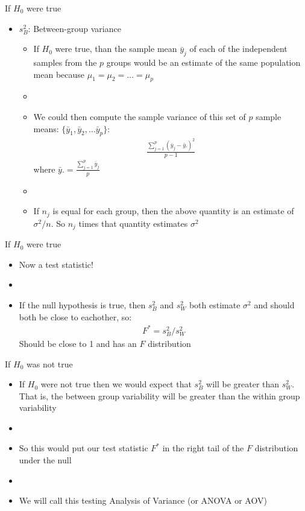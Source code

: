 \documentclass[xcolor=dvipsnames]{beamer}
\begin{document}
\begin{frame}{If $H_0$ were true}
	\begin{itemize}
		\item $s_B^2$: Between-group variance 
		\begin{itemize}
			\item If $H_0$ were true, than the sample mean  $\bar{y}_j$ of each of the independent samples from the $p$ groups would be an estimate of the same population mean because $\mu_1 = \mu_2 = \hdots = \mu_p$
			\item[]
			\item We could then compute the sample variance of this set of $p$ sample means: $\{\bar{y}_1, \bar{y}_2, \hdots \bar{y}_p\}$:
			\begin{gather*}
				\frac{\sum_{j=1}^p (\bar{y}_j - \bar{y}.)^2}{p-1}
			\end{gather*}
			where $\bar{y}. = \frac{\sum_{j=1}^p \bar{y}_j}{p}$
			\item[]
			\item If $n_j$ is equal for each group, then the above quantity is an estimate of $\sigma^2 / n$. So $n_j$ times that quantity estimates $\sigma^2$
		\end{itemize}
	\end{itemize}
\end{frame}

\begin{frame}{If $H_0$ were true}
	\begin{itemize}
		\item Now a test statistic!
		\item[]
		\item If the null hypothesis is true, then $s_B^2$ and $s_W^2$ both estimate $\sigma^2$ and should both be close to eachother, so:
		\begin{gather*}
		F^* = s_B^2 / s_W^2
		\end{gather*}
		Should be close to 1 and has an $F$ distribution
	\end{itemize}
\end{frame}

\begin{frame}{If $H_0$ was not true}
	\begin{itemize}
		\item If $H_0$ were not true then we would expect that $s^2_B$ will be greater than $s_W^2$. That is, the between group variability will be greater than the within group variability 
		\item[]
		\item So this would put our test statistic $F^*$ in the right tail of the $F$ distribution under the null
		\item[]
		\item We will call this testing Analysis of Variance (or ANOVA or AOV)
	\end{itemize}
\end{frame}
\end{document}
